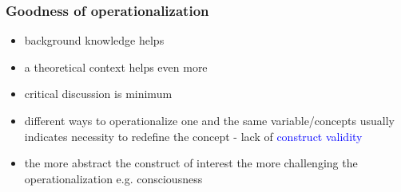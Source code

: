 \documentclass[]{beamer}
\begin{document}
% 
% 


\begin{frame}
\frametitle{Goodness of operationalization}
\begin{itemize}
 \item background knowledge helps
 \item a theoretical context helps even more
 \item critical discussion is minimum 
 \item different ways to operationalize one and the same variable/concepts usually indicates necessity to redefine the concept - lack of \textcolor{blue}{construct validity}
 \item the more abstract the construct of interest the more challenging the operationalization e.g. consciousness 
\end{itemize}
\end{frame}
\end{document}
